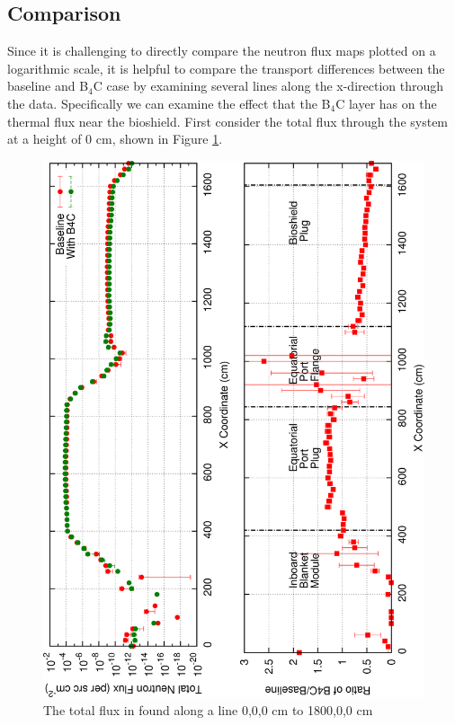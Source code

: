 \documentclass[12pt]{article}
\begin{document}
\newpage
\clearpage
\subsection{Comparison}
Since it is challenging to directly compare the neutron flux maps plotted on
a logarithmic scale, it is helpful to compare the transport differences between the baseline and B$_4$C case 
by examining several lines along the x-direction through the data. Specifically we can examine
the effect that the B$_4$C layer has on the thermal flux near the bioshield. 
First consider the total flux through the system at a height of 0 cm, shown
in Figure \ref{fig:total_flux_ep}. 

\begin{figure}[ht!]
  \centering
  \includegraphics[angle=-90,clip,scale=0.15]{../plots/neutron/total_flux_ep.png}     
  \caption{The total flux in found along a line 0,0,0 cm to 1800,0,0 cm}
  \label{fig:total_flux_ep}
\end{figure}
\end{document}
